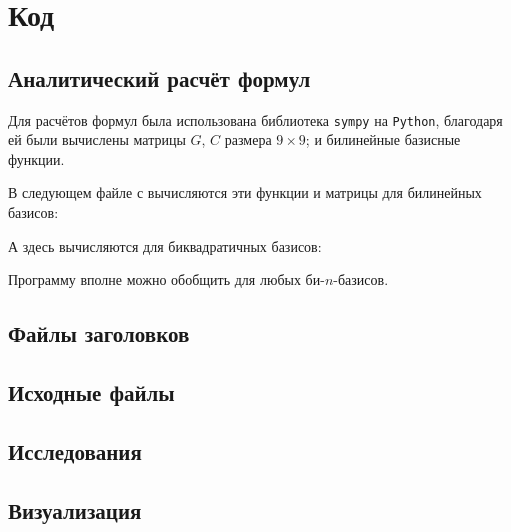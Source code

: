 \section{Код}

\subsection{Аналитический расчёт формул}

Для расчётов формул была использована библиотека \texttt{sympy} на \texttt{Python}, благодаря ей были вычислены матрицы $G$, $C$ размера $9\times 9$; и билинейные базисные функции. 

В следующем файле с вычисляются эти функции и матрицы для билинейных базисов:


А здесь вычисляются для биквадратичных базисов:


Программу вполне можно обобщить для любых би-$n$-базисов.

\subsection{Файлы заголовков}


\subsection{Исходные файлы}


\subsection{Исследования}


\subsection{Визуализация}

